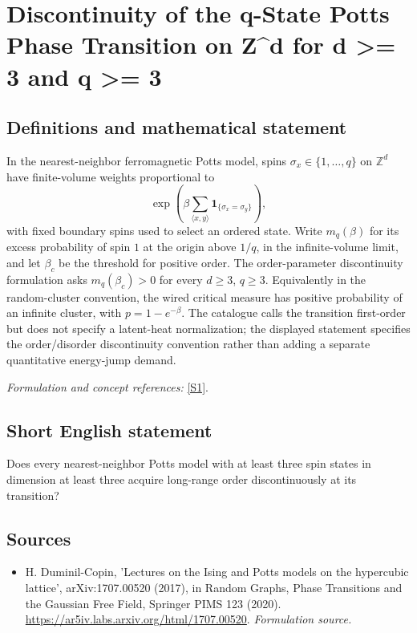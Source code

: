 \documentclass[11pt]{article}
\begin{document}
\section*{\texorpdfstring{Discontinuity of the q-State Potts Phase Transition on Z\textasciicircum{}d for d >= 3 and q >= 3}{Discontinuity of the q-State Potts Phase Transition on Z\textasciicircum{}d for d >= 3 and q >= 3}}\label{333}
\subsection{Definitions and mathematical statement}
In the nearest-neighbor ferromagnetic Potts model, spins $\sigma_x\in\{1,\ldots,q\}$ on ${\mathbb{Z}}^d$ have finite-volume weights proportional to
\[
 \exp\!\left(\beta\sum_{\langle x,y\rangle}
 \mathbf1_{\{\sigma_x=\sigma_y\}}\right),
\]
with fixed boundary spins used to select an ordered state. Write $m_q(\beta)$ for its excess probability of spin $1$ at the origin above $1/q$, in the infinite-volume limit, and let $\beta_c$ be the threshold for positive order. The order-parameter discontinuity formulation asks $m_q(\beta_c)>0$ for every $d\ge3$, $q\ge3$. Equivalently in the random-cluster convention, the wired critical measure has positive probability of an infinite cluster, with $p=1-e^{-\beta}$. The catalogue calls the transition first-order but does not specify a latent-heat normalization; the displayed statement specifies the order/disorder discontinuity convention rather than adding a separate quantitative energy-jump demand.
\par\smallskip\textit{Formulation and concept references:} \href{https://ar5iv.labs.arxiv.org/html/1707.00520}{[S1]}.

\subsection{Short English statement}
Does every nearest-neighbor Potts model with at least three spin states in dimension at least three acquire long-range order discontinuously at its transition?
\subsection{Sources}
\begin{itemize}
\item[S1]H. Duminil-Copin, 'Lectures on the Ising and Potts models on the hypercubic lattice', arXiv:1707.00520 (2017), in Random Graphs, Phase Transitions and the Gaussian Free Field, Springer PIMS 123 (2020).
\url{https://ar5iv.labs.arxiv.org/html/1707.00520}.
\textit{Formulation source.}
\end{itemize}
\end{document}
